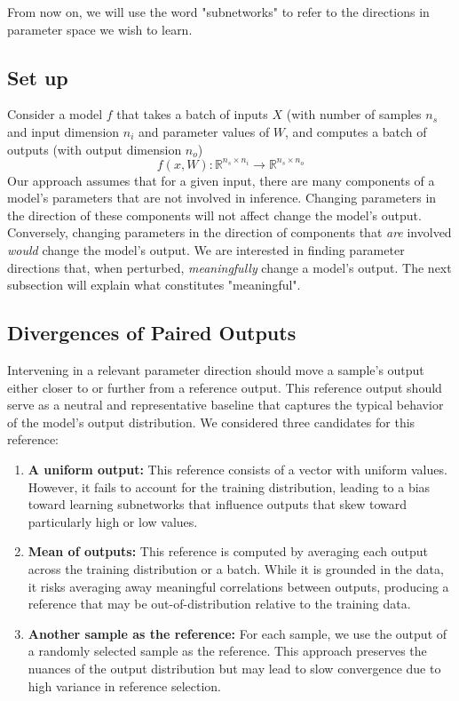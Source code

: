 \documentclass{article}
\theoremstyle{plain}
\theoremstyle{definition}
\theoremstyle{remark}
\begin{document}
From now on, we will use the word "subnetworks" to refer to the directions in parameter space we wish to learn. 

\subsection{Set up}\label{subsec:setup}

Consider a model $f$ that takes a batch of inputs $X$ (with number of samples $n_s$ and input dimension $n_i$ and parameter values of $W$, and computes a batch of outputs (with output dimension $n_o$)
\begin{equation}
    f(x, W) : \mathbb{R}^{n_s \times n_i} \rightarrow \mathbb{R}^{n_s \times n_o}
\end{equation}
Our approach assumes that for a given input, there are many components of a model's parameters that are not involved in inference. Changing parameters in the direction of these components will not affect change the model's output. Conversely, changing parameters in the direction of components that \textit{are} involved \textit{would} change the model's output. We are interested in finding parameter directions that, when perturbed, \textit{meaningfully} change a model's output.  The next subsection will explain what constitutes "meaningful".

\subsection{Divergences of Paired Outputs}\label{subsec:divergences}

Intervening in a relevant parameter direction should move a sample’s output either closer to or further from a reference output. This reference output should serve as a neutral and representative baseline that captures the typical behavior of the model’s output distribution. We considered three candidates for this reference:

\begin{enumerate}
    \item \textbf{A uniform output:} This reference consists of a vector with uniform values. However, it fails to account for the training distribution, leading to a bias toward learning subnetworks that influence outputs that skew toward particularly high or low values.
    \item \textbf{Mean of outputs:} This reference is computed by averaging each output across the training distribution or a batch. While it is grounded in the data, it risks averaging away meaningful correlations between outputs, producing a reference that may be out-of-distribution relative to the training data.
    \item \textbf{Another sample as the reference:} For each sample, we use the output of a randomly selected sample as the reference. This approach preserves the nuances of the output distribution but may lead to slow convergence due to high variance in reference selection.
\end{enumerate}
\end{document}
